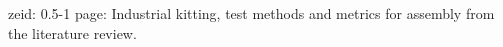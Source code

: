 zeid: 0.5-1 page: Industrial kitting, test methods and metrics for assembly from the literature review.